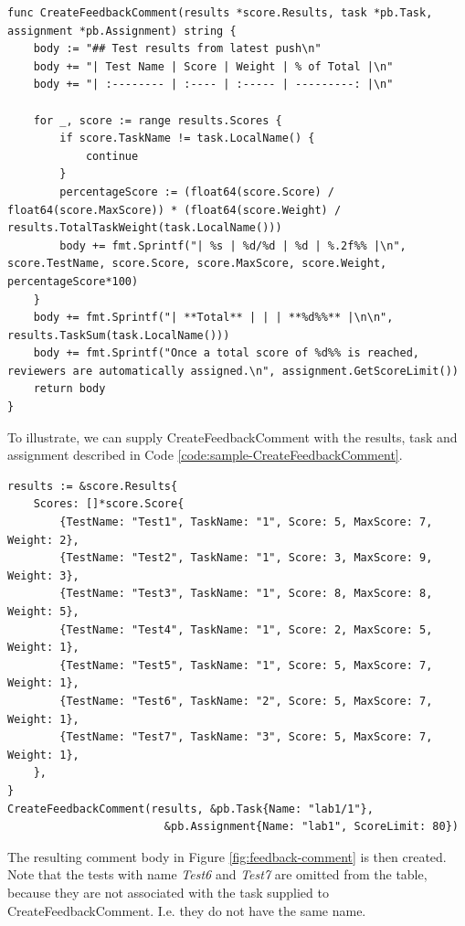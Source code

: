 \begin{lstlisting}[caption={The CreateFeedbackComment function}, label={code:CreateFeedbackComment}, language=Golang]
func CreateFeedbackComment(results *score.Results, task *pb.Task, assignment *pb.Assignment) string {
	body := "## Test results from latest push\n"
	body += "| Test Name | Score | Weight | % of Total |\n"
	body += "| :-------- | :---- | :----- | ---------: |\n"

	for _, score := range results.Scores {
		if score.TaskName != task.LocalName() {
			continue
		}
		percentageScore := (float64(score.Score) / float64(score.MaxScore)) * (float64(score.Weight) / results.TotalTaskWeight(task.LocalName()))
		body += fmt.Sprintf("| %s | %d/%d | %d | %.2f%% |\n", score.TestName, score.Score, score.MaxScore, score.Weight, percentageScore*100)
	}
	body += fmt.Sprintf("| **Total** | | | **%d%%** |\n\n", results.TaskSum(task.LocalName()))
	body += fmt.Sprintf("Once a total score of %d%% is reached, reviewers are automatically assigned.\n", assignment.GetScoreLimit())
	return body
}
\end{lstlisting}

To illustrate, we can supply CreateFeedbackComment with the results, task and assignment described in Code \ref{code:sample-CreateFeedbackComment}.
\begin{lstlisting}[caption={Example of a CreateFeedbackComment run}, label={code:sample-CreateFeedbackComment}, language=Golang]
results := &score.Results{
	Scores: []*score.Score{
		{TestName: "Test1", TaskName: "1", Score: 5, MaxScore: 7, Weight: 2},
		{TestName: "Test2", TaskName: "1", Score: 3, MaxScore: 9, Weight: 3},
		{TestName: "Test3", TaskName: "1", Score: 8, MaxScore: 8, Weight: 5},
		{TestName: "Test4", TaskName: "1", Score: 2, MaxScore: 5, Weight: 1},
		{TestName: "Test5", TaskName: "1", Score: 5, MaxScore: 7, Weight: 1},
		{TestName: "Test6", TaskName: "2", Score: 5, MaxScore: 7, Weight: 1},
		{TestName: "Test7", TaskName: "3", Score: 5, MaxScore: 7, Weight: 1},
	},
}
CreateFeedbackComment(results, &pb.Task{Name: "lab1/1"}, 
                        &pb.Assignment{Name: "lab1", ScoreLimit: 80})
\end{lstlisting}

The resulting comment body in Figure \ref{fig:feedback-comment} is then created.
Note that the tests with name \textit{Test6} and \textit{Test7} are omitted from the table, because they are not associated with the task supplied to CreateFeedbackComment.
I.e. they do not have the same name.

